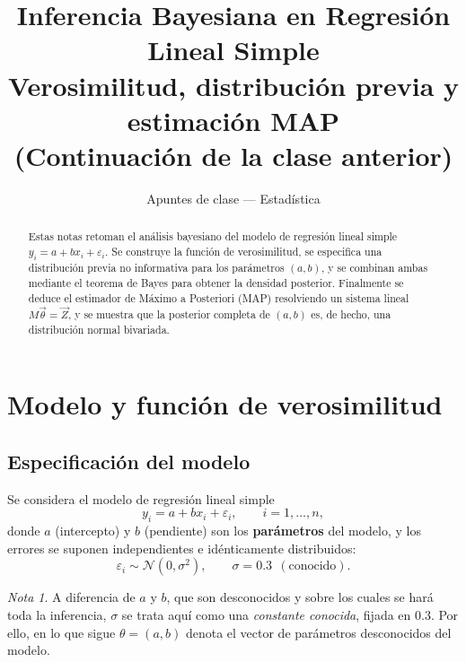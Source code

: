 \documentclass[11pt]{article}
\title{\textbf{Inferencia Bayesiana en Regresión Lineal Simple}\\[4pt]
\large Verosimilitud, distribución previa y estimación MAP\\
\normalsize (Continuación de la clase anterior)}
\author{Apuntes de clase --- Estadística}
\date{}
\theoremstyle{remark}
\newtheorem*{nota}{Nota}
\begin{document}
\maketitle

\begin{abstract}
\noindent
Estas notas retoman el análisis bayesiano del modelo de regresión lineal
simple $y_i = a + bx_i + \varepsilon_i$. Se construye la función de
verosimilitud, se especifica una distribución previa no informativa para los
parámetros $(a,b)$, y se combinan ambas mediante el teorema de Bayes para
obtener la densidad posterior. Finalmente se deduce el estimador de Máximo a
Posteriori (MAP) resolviendo un sistema lineal $M\vec\theta=\vec Z$, y se
muestra que la posterior completa de $(a,b)$ es, de hecho, una distribución
normal bivariada.
\end{abstract}

\tableofcontents

\section{Modelo y función de verosimilitud}

\subsection{Especificación del modelo}

Se considera el modelo de regresión lineal simple
\begin{equation}
y_i = a + bx_i + \varepsilon_i, \qquad i=1,\dots,n,
\label{eq:modelo}
\end{equation}
donde $a$ (intercepto) y $b$ (pendiente) son los \textbf{parámetros} del
modelo, y los errores se suponen independientes e idénticamente distribuidos:
\begin{equation}
\varepsilon_i \sim \mathcal{N}(0,\sigma^2), \qquad \sigma = 0.3 \ \ (\text{conocido}).
\label{eq:error}
\end{equation}

\begin{nota}
A diferencia de $a$ y $b$, que son desconocidos y sobre los cuales se hará
toda la inferencia, $\sigma$ se trata aquí como una \emph{constante conocida},
fijada en $0.3$. Por ello, en lo que sigue $\theta=(a,b)$ denota el vector de
parámetros desconocidos del modelo.
\end{nota}
\end{document}
